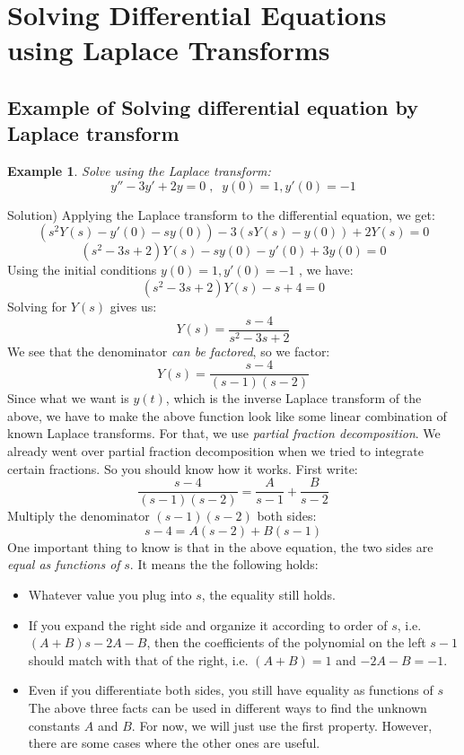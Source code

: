 \documentclass[12pt]{report}
\newtheorem{ex}{Example}[section]
\begin{document}
\section{Solving Differential Equations using Laplace Transforms}

\subsection*{Example of Solving differential equation by Laplace transform}

\begin{ex} Solve using the Laplace transform:
$$y'' - 3y' +2y = 0  \; , \; \; y(0)=1, y'(0)=-1$$
\end{ex}
Solution)
Applying the Laplace transform to the differential equation, we get:
$$ \left( s^2 Y(s) - y'(0) - s y(0) \right) - 3 \left( s Y(s) - y(0) \right) + 2 Y(s) =0 $$
$$ \left( s^2 -3s + 2 \right) Y(s) - s y(0) -y'(0) + 3y(0) = 0 $$
Using the initial conditions $y(0)=1, y'(0)=-1$
, we have:
$$ \left( s^2 -3s + 2 \right) Y(s) - s + 4 = 0 $$
Solving for $Y(s)$ gives us:
$$ Y(s) = \frac{s-4}{s^2 -3s +2} $$
We see that the denominator \textit{can be factored}, so we factor:
$$ Y(s) = \frac{s-4}{(s-1)(s-2)} $$
Since what we want is $y(t)$, which is the inverse Laplace transform of the above, we have to make the above function look like some linear combination of known Laplace transforms. For that, we use \textit{partial fraction decomposition}. We already went over partial fraction decomposition when we tried to integrate certain fractions. So you should know how it works. First write:
$$\frac{s-4}{(s-1)(s-2)} = \frac{A}{s-1}+\frac{B}{s-2} $$
Multiply the denominator $(s-1)(s-2)$ both sides:
$$s-4 = A(s-2)+B(s-1) $$
One important thing to know is that in the above equation, the two sides are \textit{equal as functions of} $s$. It means the the following holds:
\begin{itemize}
\item  Whatever value you plug into $s$, the equality still holds.
\item  If you expand the right side and organize it according to order of $s$, i.e. $(A+B)s -2A -B$, then the coefficients of the polynomial on the left $s-1$ should match with that of the right, i.e. $(A+B) = 1$ and $-2A-B= -1$.
\item  Even if you differentiate both sides, you still have equality as functions of $s$
The above three facts can be used in different ways to find the unknown constants $A$ and $B$. For now, we will just use the first property. However, there are some cases where the other ones are useful.
\end{itemize}
\end{document}
